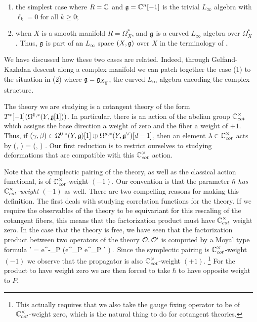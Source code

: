 \documentclass[10pt]{amsart}
\begin{document}
\begin{enumerate}
\item the simplest case where $R = \mathbb C$ and $\mathfrak g = \mathbb C^n[-1]$ is the trivial $L_\infty$ algebra with $\ell_k = 0$ for all $k \geq 0$; 
\item when $X$ is a smooth manifold $R = \Omega^*_X$, and $\mathfrak g$ is a curved $L_\infty$ algebra over $\Omega^*_X$. 
Thus, $\mathfrak g$ is part of an $L_\infty$ space $(X, \mathfrak g)$ over $X$ in the terminology of \cite{wg2, GradyGwilliamDerived}.
\end{enumerate}

We have discussed how these two cases are related.
Indeed, through Gelfand-Kazhdan descent along a complex manifold we can patch together the case (1) to the situation in (2) where $\mathfrak g = \mathfrak g_{X_{\overline{\partial}}}$, the curved $L_\infty$ algebra encoding the complex structure. 

The theory we are studying is a cotangent theory of the form $T^*[-1] (\Omega^{0,*}(Y, \mathfrak g[1]))$. 
In particular, there is an action of the abelian group $\mathbb C^\times_{cot}$ which assigns the base direction a weight of zero and the fiber a weight of $+1$. 
Thus, if $(\gamma, \beta) \in \Omega^{0,*}(Y, \mathfrak g) [1] \oplus \Omega^{d,*}(Y, \mathfrak g^\vee)[d-1]$, then an element $\lambda \in \mathbb C^\times_{cot}$ acts by
\ben
\lambda \cdot (\gamma, \beta) = (\gamma, \lambda \beta) .
\een
Our first reduction is to restrict ourselves to studying deformations that are compatible with this $\mathbb C^\times_{cot}$ action.

Note that the symplectic pairing of the theory, as well as the classical action functional, is of $\mathbb C^{\times}_{cot}$-weight $(-1)$.
Our convention is that the parameter $\hbar$ {\em has $\mathbb C^\times_{cot}$-weight $(-1)$} as well. 
There are two compelling reasons for making this definition. 
The first deals with studying correlation functions for the theory. 
If we require the observables of the theory to be equivariant for this rescaling of the cotangent fibers, this means that the factorization product must have $\mathbb C^\times_{cot}$ weight zero.
In the case that the theory is free, we have seen that the factorization product between two operators of the theory $\mathcal O, \mathcal O'$ is computed by a Moyal type formula
\ben
\cO \star \cO' = e^{-\hbar \partial_P} \left(e^{\hbar \partial_P} \cO \cdot e^{\hbar \partial_P} \cO' \right) .
\een
Since the symplectic pairing is $\mathbb C^\times_{cot}$-weight $(-1)$ we observe that the propagator is also $\mathbb C^\times_{cot}$-weight $(+1)$.
\footnote{This actually requires that we also take the gauge fixing operator to be of $\mathbb C^\times_{cot}$-weight zero, which is the natural thing to do for cotangent theories.}
For the product to have weight zero we are then forced to take $\hbar$ to have opposite weight to $P$.
\end{document}

